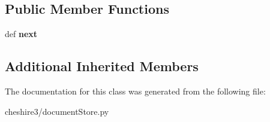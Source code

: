 \subsection*{Public Member Functions}
\begin{DoxyCompactItemize}
\item 
\hypertarget{classcheshire3_1_1document_store_1_1_bdb_doc_iter_a841ab3eda66661b67ebe744a42686dac}{def {\bfseries next}}\label{classcheshire3_1_1document_store_1_1_bdb_doc_iter_a841ab3eda66661b67ebe744a42686dac}

\end{DoxyCompactItemize}
\subsection*{Additional Inherited Members}


The documentation for this class was generated from the following file\-:\begin{DoxyCompactItemize}
\item 
cheshire3/document\-Store.\-py\end{DoxyCompactItemize}

